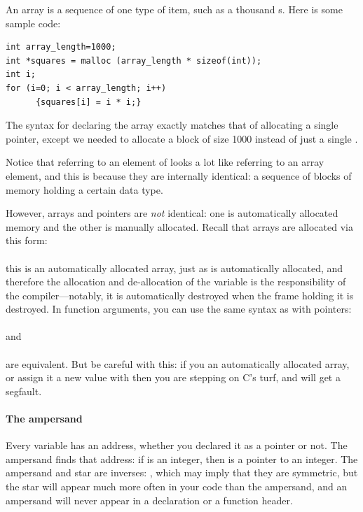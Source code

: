 \documentclass[12pt]{article}
\begin{document}
An array is a sequence of one type of item, such as a thousand s. Here is some sample code:
\begin{lstlisting}
int array_length=1000;
int *squares = malloc (array_length * sizeof(int));
int i;
for (i=0; i < array_length; i++)
      {squares[i] = i * i;}
\end{lstlisting}
The syntax for declaring the array exactly matches that of allocating
a single pointer, except we needed to allocate a block of size 1000
 instead of just a single . 

Notice that referring to an element of  looks a lot
like referring to an array element, and this is because they are
internally identical: a sequence of blocks of memory holding a certain
data type. 

However, arrays and pointers are {\em not} identical: one is
automatically allocated memory and the other is manually allocated.
Recall that arrays are allocated via this form:\\
\\
this is an automatically allocated array, just
as  is automatically allocated, and therefore
the allocation and de-allocation of the variable is the responsibility
of the compiler---notably, it is automatically destroyed when the frame
holding it is destroyed. In function arguments, you can use the same
syntax as with pointers: 
\\ \\
and
\\ \\
are equivalent.
But be careful with this: if you  an automatically allocated
array, or assign it a new value with  then you are stepping
on C's turf, and will get a segfault.

\paragraph{The ampersand}\index{\&} Every variable has an address, whether you
declared it as a pointer or not. The ampersand finds that address: if
 is an integer, then  is a pointer to an integer.
The ampersand and star are inverses: , which
may imply that they are symmetric, but the star will appear much more
often in your code than the ampersand, and 
an ampersand will never appear in a declaration or a function header.
\end{document}
